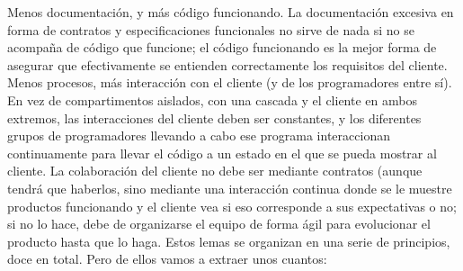 Menos documentación, y más código funcionando. La documentación excesiva en forma de contratos y especificaciones funcionales no sirve de nada si no se acompaña de código que funcione; el código funcionando es la mejor forma de asegurar que efectivamente se entienden correctamente los requisitos del cliente.
Menos procesos, más interacción con el cliente (y de los programadores entre sí). En vez de compartimentos aislados, con una cascada y el cliente en ambos extremos, las interacciones del cliente deben ser constantes, y los diferentes grupos de programadores llevando a cabo ese programa interaccionan continuamente para llevar el código a un estado en el que se pueda mostrar al cliente.
La colaboración del cliente no debe ser mediante contratos (aunque tendrá que haberlos, sino mediante una interacción continua donde se le muestre productos funcionando y el cliente vea si eso corresponde a sus expectativas o no; si no lo hace, debe de organizarse el equipo de forma ágil para evolucionar el producto hasta que lo haga.
Estos lemas se organizan en una serie de principios, doce en total. Pero de ellos vamos a extraer unos cuantos:

